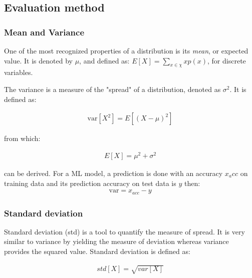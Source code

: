 	

\subsection{Evaluation method}\label{sec:evaluation_method} %


\subsubsection{Mean and Variance}
One of the most recognized properties of a distribution is its \textit{mean}, or expected value. It is denoted by $\mu$, and defined as: $E[X] = \sum_{x \in \chi}x p(x)$, for discrete variables.

The variance is a measure of the "spread" of a distribution, denoted as $\sigma^2$. It is defined as:

\begin{align}
\text{var}[X^2] = E[(X - \mu)^2]
\end{align}

from which:

\begin{align}
E[X] =\mu^2 + \sigma^2
\end{align}

can be derived. For a ML model, a prediction is done with an accuracy $x_acc$ on training data and its prediction accuracy on test data is $y$ then:
\begin{align}
\text{var} = x_{acc} - y
\end{align}

\subsubsection{Standard deviation}

Standard deviation (\ac{std}) is a tool to quantify the measure of spread. It is very similar to variance by yielding the measure of deviation whereas variance provides the squared value. Standard deviation is defined as:

\begin{align}
std[X] = \sqrt{var[X]}
\end{align}

